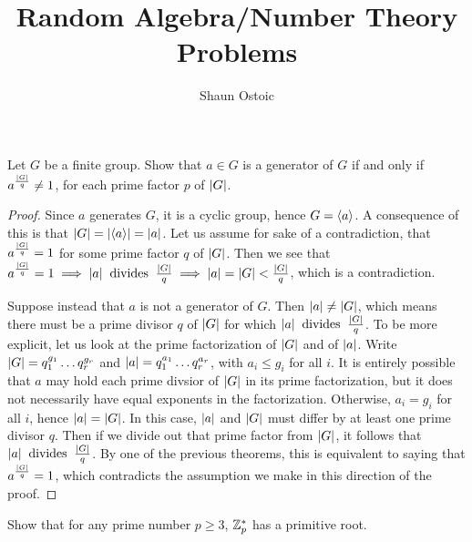 \documentclass[11pt]{article}
\begin{document}
 
 
\title{Random Algebra/Number Theory Problems}
\author{Shaun Ostoic} 
 
\maketitle

\begin{exercise}{1}
Let $G$ be a finite group. Show that $a \in G$ is a generator of $G$ if and only if $a^{\frac{|G|}{q}} \neq 1$, for each prime factor $p$ of $|G|$.
\end{exercise}

\begin{proof}\necessary Since $a$ generates $G$, it is a cyclic group, hence $ G = \langle a \rangle $. A consequence of this is that $ |G| = |\langle a \rangle| = |a| $. Let us assume for sake of a contradiction, that $a^{\frac{|G|}{q}} = 1$ for some prime factor $ q $ of $ |G| $. Then we see that $ a^{\frac{|G|}{q}} = 1 \implies |a| \mathbin{\text{\ divides\ }} \frac{|G|}{q} \implies |a| = |G| < \frac{|G|}{q}$, which is a contradiction.

\sufficient Suppose instead that $ a $ is not a generator of $ G $. Then $|a| \neq |G| $, which means there must be a prime divisor $ q $ of $ |G| $ for which $ |a| \mathbin{\text{\ divides\ }} \frac{|G|}{q} $. To be more explicit, let us look at the prime factorization of $ |G| $ and of $ |a| $. Write $ |G| = q_{1}^{g_{1}} \dots q_{r}^{g_{r}}$ and $ |a| = q_{1}^{a_{1}} \dots q_{r}^{a_{r}}$, with $ a_{i} \leq g_{i} $ for all $ i $. It is entirely possible that $ a $ may hold each prime divsior of $ |G| $ in its prime factorization, but it does not necessarily have equal exponents in the factorization. Otherwise, $ a_{i} = g_{i} $ for all $ i $, hence $ |a| = |G| $. In this case, $ |a| $ and $ |G| $ must differ by at least one prime divisor $ q $. Then if we divide out that prime factor from $ |G| $, it follows that $ |a| \mathbin{\text{\ divides\ }} \frac{|G|}{q} $. By one of the previous theorems, this is equivalent to saying that $ a^{\frac{|G|}{q}} = 1 $, which contradicts the assumption we make in this direction of the proof.

\end{proof}

\begin{exercise}{2}
Show that for any prime number $ p \geq 3 $, $ \mathbb{Z}_{p}^{*} $ has a primitive root.
\end{exercise}
\end{document}

